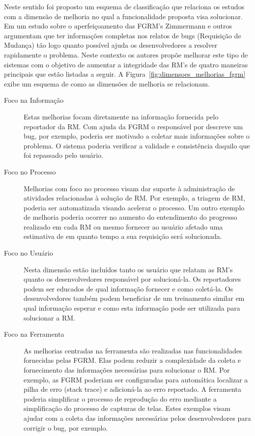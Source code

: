 Neste sentido foi proposto um esquema de classificação que relaciona os estudos
com a dimensão de melhoria no qual a funcionalidade proposta visa solucionar. Em
um estudo sobre o aperfeiçoamento das FGRM's Zimmermann e
outros~\cite{zimmermann2009improving} argumentam que ter informações completas
nos relatos de bugs (Requisição de Mudança) tão logo quanto possível ajuda os
desenvolvedores a resolver rapidamente o problema. Neste contexto os autores
propõe melhorar este tipo de sistemas com o objetivo de aumentar a integridade
das RM's de quatro maneiras principais que estão listadas a seguir. A
Figura~\ref{fig:dimensoes_melhorias_fgrm} exibe um esquema de como as dimensões
de melhoria se relacionam.

\begin{description}
	\item[Foco na Informação] Estas melhorias focam diretamente na informação
		fornecida pelo reportador da RM\@. Com ajuda da FGRM o responsável por
		descreve um bug, por exemplo, poderia ser motivado a coletar mais
		informações sobre o problema. O sistema poderia verificar a validade e
		consistência daquilo que foi repassado pelo usuário.
   \item[Foco no Processo] Melhorias com foco no processo visam dar suporte à
	   administração de atividades relacionadas à solução de RM\@. Por exemplo,
	   a triagem de RM, poderia ser automatizada visando acelerar o processo. Um
	   outro exemplo de melhoria poderia ocorrer no aumento do entendimento do
	   progresso realizado em cada RM ou mesmo fornecer ao usuário afetado uma
	   estimativa de em quanto tempo a sua requisição será solucionada.
   \item[Foco no Usuário] Nesta dimensão estão incluídos tanto os usuário que
	   relatam as RM's quanto os desenvolvedores responsável por solucioná-la.
	   Os reportadores podem ser educados de qual informação fornecer e como
	   coletá-la. Os desenvolvedores também podem beneficiar de um treinamento
	   similar em qual informação esperar e como esta informação pode ser
	   utilizada para solucionar a RM\@.
	\item[Foco na Ferramenta] As melhorias centradas na ferramenta são
		realizadas nas funcionalidades fornecidas pelas FGRM\@. Elas podem
		reduzir a complexidade da coleta e fornecimento das informações
		necessárias para solucionar o RM\@. Por exemplo, as FGRM poderiam ser
		configuradas para automática localizar a pilha de erro (stack trace) e
		adicioná-la ao erro reportado.  A ferramenta poderia simplificar o
		processo de reprodução do erro mediante a simplificação do processo de
		capturas de telas. Estes exemplos visam ajudar com a coleta das
		informações necessárias pelos desenvolvedores para corrigir o bug, por
		exemplo.

\end{description}
